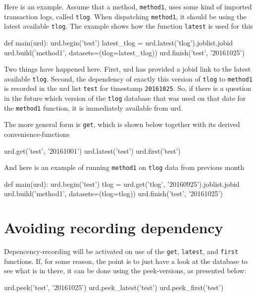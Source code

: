 Here is an example.  Assume that a method, \texttt{method1}, uses some
kind of imported transaction logs, called \texttt{tlog}.  When
dispatching \texttt{method1}, it should be using the latest available
\texttt{tlog}.  The example shows how the function \texttt{latest} is
used for this\\
\begin{python}
def main(urd):
  urd.begin('test')
  latest_tlog = urd.latest('tlog').joblist.jobid
  urd.build('method1', datasets=(tlog=latest_tlog))
  urd.finish('test', '20161025')
\end{python}
Two things have happened here.  First, urd has provided a jobid link
to the latest available \texttt{tlog}.  Second, the dependency of
exactly this version of \texttt{tlog} to \texttt{method1} is recorded
in the urd list \texttt{test} for timestamp \texttt{20161025}.  So, if
there is a question in the future which version of the \texttt{tlog}
database that was used on that date for the \texttt{method1} function,
it is immediately available from urd.

The more general form is \texttt{get}, which is shown below together
with its derived convenience-functions\\
\begin{python}
  urd.get('test', '20161001')
  urd.latest('test')
  urd.first('test')
\end{python}
And here is an example of running \texttt{method1} on \texttt{tlog} data
from previous month\\
\begin{python}
def main(urd):
  urd.begin('test')
  tlog = urd.get('tlog', '20160925').joblist.jobid
  urd.build('method1', datasets=(tlog=tlog))
  urd.finish('test', '20161025')
\end{python}



\section{Avoiding recording dependency}
Depencency-recording will be activated on use of the \texttt{get},
\texttt{latest}, and \texttt{first} functions.  If, for some reason,
the point is to just have a look at the database to see what is in
there, it can be done using the peek-versions, as presented below:\\
\begin{python}
  urd.peek('test', '20161025')
  urd.peek_latest('test')
  urd.peek_first('test')
\end{python}



